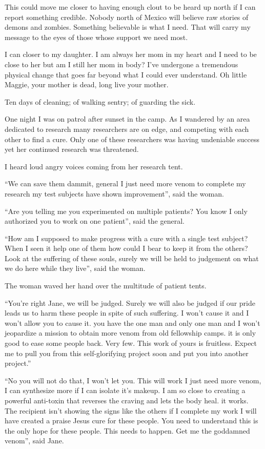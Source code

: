 This could move me closer to having enough clout to be heard up north if I can report something credible. Nobody north of Mexico will believe raw stories of demons and zombies. Something believable is what I need. That will carry my message to the eyes of those whose support we need most.

I can closer to my daughter. I am always her mom in my heart and I need to be close to her but am I still her mom in body? I've undergone a tremendous physical change that goes far beyond what I could ever understand. Oh little Maggie, your mother is dead, long live your mother.

\parasep

Ten days of cleaning; of walking sentry; of guarding the sick.

One night I was on patrol after sunset in the camp. As I wandered by an area dedicated to research many researchers are on edge, and competing with each other to find a cure. Only one of these researchers was having undeniable success yet her continued research was threatened.

I heard loud angry voices coming from her research tent. 

``We can save them dammit, general I just need more venom to complete my research my test subjects have shown improvement'', said the woman.

``Are you telling me you experimented on multiple patients? You know I only authorized you to work on one patient'', said the general.

``How am I supposed to make progress with a cure with a single test subject? When I seen it help one of them how could I bear to keep it from the others? Look at the suffering of these souls, surely we will be held to judgement on what we do here while they live'', said the woman.

The woman waved her hand over the multitude of patient tents. 

``You're right Jane, we will be judged. Surely we will also be judged if our pride leads us to harm these people in spite of such suffering. I won't cause it and I won't allow you to cause it. you have the one man and only one man and I won't jeopardize a mission to obtain more venom from old fellowship camps. it is only good to ease some people back. Very few. This work of yours is fruitless. Expect me to pull you from this self-glorifying project soon and put you into another project.''

``No you will not do that, I won't let you. This will work I just need more venom, I can synthesize more if I can isolate it's makeup. I am so close to creating a powerful anti-toxin that reverses the craving and lets the body heal. it works. The recipient isn't showing the signs like the others if I complete my work I will have created a praise Jesus cure for these people. You need to understand this is the only hope for these people. This needs to happen. Get me the goddamned venom'', said Jane.

